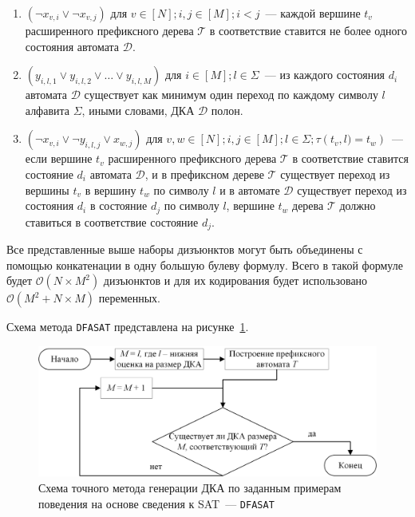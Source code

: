 \begin{enumerate}
  \item $\left(\neg x_{v,i} \vee \neg x_{v,j}\right)$ для $v \in \left[N\right]; i,j \in \left[M\right]; i < j$~{---} каждой вершине $t_{v}$ расширенного префиксного дерева $\mathcal{T} $ в соответствие ставится не более одного состояния автомата $\mathcal{D}$.
  \item $\left(y_{i,l,1} \vee y_{i,l,2} \vee \ldots \vee y_{i,l,M}\right)$ для $i \in \left[M\right]; l \in \Sigma$~{---} из каждого состояния $d_{i}$ автомата $\mathcal{D}$ существует как минимум один переход по каждому символу $l$ алфавита $\Sigma$, иными словами, ДКА $\mathcal{D}$ полон.
  \item $\left(\neg x_{v,i} \vee \neg y_{i,l,j} \vee x_{w,j}\right)$ для $v,w \in \left[N\right]; i,j \in \left[M\right];l \in \Sigma; \tau\left(t_{v},l) = t_{w}\right)$~{---} если вершине $t_{v}$ расширенного префиксного дерева $\mathcal{T} $ в соответствие ставится состояние $d_{i}$ автомата $\mathcal{D}$, и в префиксном дереве $\mathcal{T}$ существует переход из вершины $t_{v}$ в вершину $t_{w}$ по символу $l$ и в автомате $\mathcal{D}$ существует переход из состояния $d_{i}$ в состояние $d_{j}$ по символу $l$, вершине $t_{w}$ дерева $\mathcal{T}$ должно ставиться в соответствие состояние $d_{j}$.
\end{enumerate}

Все представленные выше наборы дизъюнктов могут быть объединены с помощью конкатенации в одну большую булеву формулу. Всего в такой формуле будет $\mathcal{O}(N \times M^{2})$ дизъюнктов и для их кодирования будет использовано $\mathcal{O}(M^2 + N \times M)$ переменных.

Схема метода \texttt{DFASAT} представлена на рисунке~\ref{img:dfasat-algo}.

\begin{figure}[ht]
  \centering
  \includegraphics[scale=0.7]{img/ntv/basic.jpg}
  \caption{Схема точного метода генерации ДКА по заданным примерам поведения на основе сведения к SAT~--- \texttt{DFASAT}}
  \label{img:dfasat-algo}
\end{figure}


